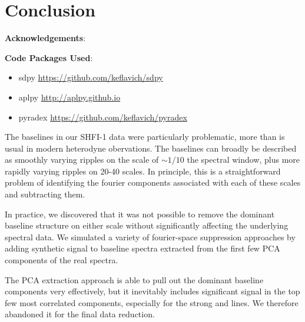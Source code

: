 \section{Conclusion}


\textbf{Acknowledgements}:

\textbf{Code Packages Used}:

\begin{itemize}
    \item sdpy \url{https://github.com/keflavich/sdpy}
    \item aplpy \url{http://aplpy.github.io}
    \item pyradex \url{https://github.com/keflavich/pyradex}
\end{itemize}

The baselines in our SHFI-1 data were particularly problematic, more than is
usual in modern heterodyne obervations.  The baselines can broadly be described
as smoothly varying ripples on the scale of $\sim1/10$ the spectral window,
plus more rapidly varying ripples on 20-40 \kms scales.  In principle, this is
a straightforward problem of identifying the fourier components associated with
each of these scales and subtracting them.

In practice, we discovered that it was not possible to remove the dominant
baseline structure on either scale without significantly affecting the
underlying spectral data.  We simulated a variety of fourier-space suppression
approaches by adding synthetic signal to baseline spectra extracted from the
first few PCA components of the real spectra.

The PCA extraction approach is able to pull out the dominant baseline
components very effectively, but it inevitably includes significant signal in
the top few most correlated components, especially for the strong \formaldehyde
and \thirteenco lines.  We therefore abandoned it for the final data reduction.






